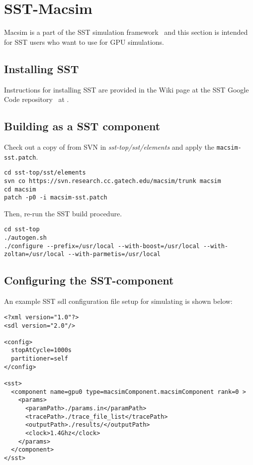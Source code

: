 \section{SST-Macsim}
\label{sec:sst}

Macsim is a part of the SST simulation framework~\cite{sst} and this section is
intended for SST users who want to use \SIM for GPU simulations.

\subsection{Installing SST}

Instructions for installing SST are provided in the Wiki
page at the SST Google Code repository~\cite{sst-google} at
.

\subsection{Building \SIM as a SST component}

Check out a copy of \SIM from SVN in \textit{sst-top/sst/elements} and
apply the \Verb+macsim-sst.patch+. 

\begin{Verbatim}
cd sst-top/sst/elements
svn co https://svn.research.cc.gatech.edu/macsim/trunk macsim
cd macsim
patch -p0 -i macsim-sst.patch
\end{Verbatim}

Then, re-run the SST build procedure.

\begin{Verbatim}
cd sst-top
./autogen.sh
./configure --prefix=/usr/local --with-boost=/usr/local --with-zoltan=/usr/local --with-parmetis=/usr/local
\end{Verbatim}

\subsection{Configuring the SST-\SIM component}

An example SST sdl configuration file setup for simulating \SIM is shown below:

\begin{Verbatim}
<?xml version="1.0"?>
<sdl version="2.0"/>

<config>
  stopAtCycle=1000s
  partitioner=self
</config>

<sst>
  <component name=gpu0 type=macsimComponent.macsimComponent rank=0 >
    <params>
      <paramPath>./params.in</paramPath>
      <tracePath>./trace_file_list</tracePath>
      <outputPath>./results/</outputPath>
      <clock>1.4Ghz</clock>
    </params>
  </component>
</sst>
\end{Verbatim}

